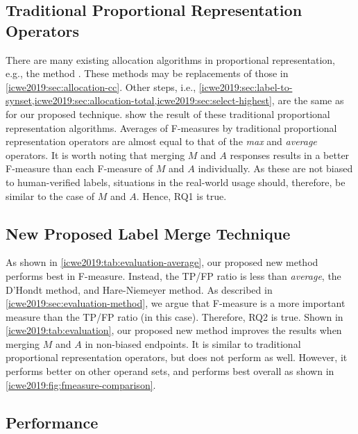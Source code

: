 \subsection{Traditional Proportional Representation Operators}

There are many existing allocation algorithms in proportional representation, e.g., the \citeauthor{Niemeyer2008240} method \citep{Niemeyer2008240}.
These methods may be replacements of those in \cref{icwe2019:sec:allocation-cc}.
Other steps, i.e., \cref{icwe2019:sec:label-to-synset,icwe2019:sec:allocation-total,icwe2019:sec:select-highest}, are the same as for our proposed technique.
 show the result of these traditional proportional representation algorithms.
Averages of F-measures by traditional proportional representation operators are almost equal to that of the \textit{max} and \textit{average} operators.
It is worth noting that merging $M$ and $A$ responses results in a better F-measure than each F-measure of $M$ and $A$ individually.
As these are not biased to human-verified labels, situations in the real-world usage should, therefore, be similar to the case of $M$ and $A$.
Hence, RQ1 is true.

\subsection{New Proposed Label Merge Technique}

As shown in \cref{icwe2019:tab:evaluation-average}, our proposed new method performs best in F-measure.
Instead, the TP/FP ratio is less than \textit{average}, the D'Hondt method, and Hare-Niemeyer method.
As described in \cref{icwe2019:sec:evaluation-method}, we argue that F-measure is a more important measure than the TP/FP ratio (in this case).
Therefore, RQ2 is true.
Shown in \cref{icwe2019:tab:evaluation}, our proposed new method improves the results when merging $M$ and $A$ in non-biased endpoints.
It is similar to traditional proportional representation operators, but does not perform as well.
However, it performs better on other operand sets, and performs best overall as shown in \cref{icwe2019:fig:fmeasure-comparison}.

\subsection{Performance}

